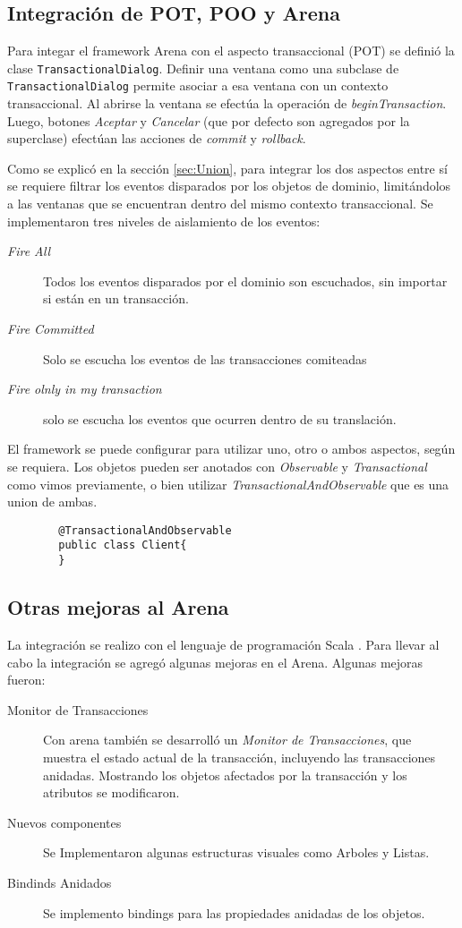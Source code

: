 \subsection{Integración de POT, POO y Arena}
Para integar el framework Arena con el aspecto transaccional (POT) se definió
la clase \lstinline|TransactionalDialog|. 
Definir una ventana como una subclase de
\lstinline|TransactionalDialog| permite asociar a esa ventana con un contexto
transaccional.
Al abrirse la ventana se efectúa la operación de \emph{beginTransaction}.
Luego, botones \emph{Aceptar} y \emph{Cancelar} (que por defecto son agregados
por la superclase) efectúan las acciones de \emph{commit} y
\emph{rollback}.

Como se explicó en la sección \ref{sec:Union}, para integrar los dos aspectos
entre sí se requiere filtrar los eventos disparados por los objetos de dominio, 
limitándolos a las ventanas que se encuentran dentro del mismo contexto
transaccional. 
Se implementaron tres niveles de aislamiento de los eventos:
\begin{description}
	\item[\emph{Fire All}] Todos los eventos disparados por el dominio son
	escuchados, sin importar si están en un transacción.

	\item[\emph{Fire Committed}] Solo se escucha los eventos de las transacciones
		comiteadas
	
	\item[\emph{Fire olnly in my transaction}] solo se escucha los eventos que
		ocurren dentro de su translación.
 \end{description}
 
El framework se puede configurar para utilizar uno, otro o ambos
aspectos, según se requiera.
Los objetos pueden ser anotados con \emph{Observable} y
\emph{Transactional} como vimos previamente, 
o bien utilizar \emph{TransactionalAndObservable} que es una union de ambas.

	\begin{lstlisting} 
		@TransactionalAndObservable
		public class Client{
		}
	\end{lstlisting}

\subsection{Otras mejoras al Arena}
	La integración se realizo con el lenguaje de programación Scala
	\cite{???}. Para llevar al cabo la integración se agregó algunas
	mejoras en el Arena. 
	Algunas mejoras fueron:
	\begin{description}
	  \item[Monitor de Transacciones]
		 Con arena también se desarrolló un \emph{Monitor de Transacciones}, que 
		 muestra el estado actual de la transacción, incluyendo las transacciones
		 anidadas. Mostrando los objetos afectados por la transacción y los
		 atributos se modificaron.
	  \item[Nuevos componentes] Se Implementaron algunas estructuras visuales como
	  Arboles y Listas.
	  \item[Bindinds Anidados] Se implemento bindings para las propiedades
	  anidadas de los objetos.
	\end{description}
